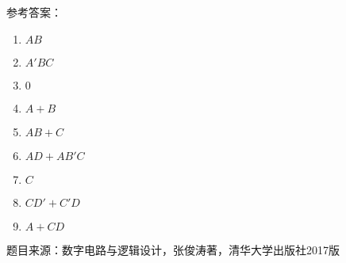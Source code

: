 \documentclass[UTF8]{ctexart}
\begin{document}
\divider

参考答案：

\begin{enumerate}
\item $AB$
\item $A'BC$
\item $0$
\item $A+B$
\item $AB+C$
\item $AD+AB'C$
\item $C$
\item $CD'+C'D$
\item $A+CD$
\end{enumerate}

\begin{thebibliography}{5}
     题目来源：数字电路与逻辑设计，张俊涛著，清华大学出版社2017版
\end{thebibliography}
\end{document}
